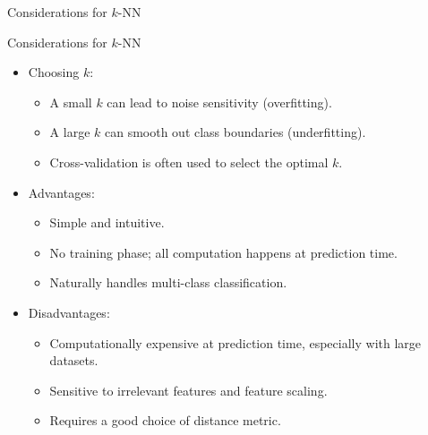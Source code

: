 \documentclass[hyperref={pdfpagelabels=false},aspectratio=169]{beamer}
\begin{document}
\begin{frame}[label={sec:org40ef388}]{Considerations for \(k\)-NN}
\begin{block}{Considerations for \(k\)-NN}
\begin{itemize}[<+->]
\item \alert{Choosing \(k\)}:
\begin{itemize}
\item A small \(k\) can lead to noise sensitivity (overfitting).
\item A large \(k\) can smooth out class boundaries (underfitting).
\item Cross-validation is often used to select the optimal \(k\).
\end{itemize}
\item \alert{Advantages}:
\begin{itemize}
\item Simple and intuitive.
\item No training phase; all computation happens at prediction time.
\item Naturally handles multi-class classification.
\end{itemize}
\item \alert{Disadvantages}:
\begin{itemize}
\item Computationally expensive at prediction time, especially with large datasets.
\item Sensitive to irrelevant features and feature scaling.
\item Requires a good choice of distance metric.
\end{itemize}
\end{itemize}
\end{block}
\end{frame}
\end{document}
